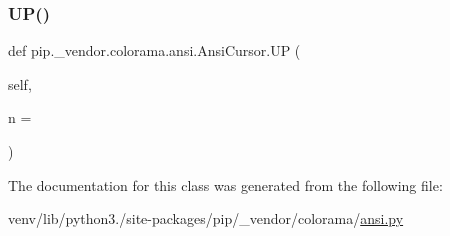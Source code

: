 \mbox{\label{classpip_1_1__vendor_1_1colorama_1_1ansi_1_1AnsiCursor_a4d915d8f1f253574e90355dd9d10a2fb}} 
\subsubsection{\texorpdfstring{U\+P()}{UP()}}
{\footnotesize\ttfamily def pip.\+\_\+vendor.\+colorama.\+ansi.\+Ansi\+Cursor.\+UP (\begin{DoxyParamCaption}\item[{}]{self,  }\item[{}]{n = {} }\end{DoxyParamCaption})}



The documentation for this class was generated from the following file\+:\begin{DoxyCompactItemize}
\item 
venv/lib/python3./site-\/packages/pip/\+\_\+vendor/colorama/\hyperlink{ansi_8py}{ansi.\+py}\end{DoxyCompactItemize}
